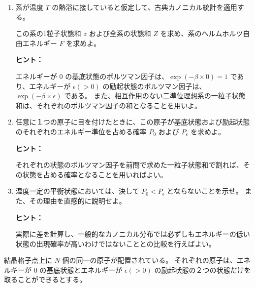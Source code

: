 \documentclass[uplatex,dvipdfmx,a4paper,11pt]{jsarticle}
\begin{document}
\begin{enumerate}
\setlength{\parskip}{0cm} %
\setlength{\itemsep}{0.3cm} %

\item
系が温度 $T$ の熱浴に接していると仮定して、古典カノニカル統計を適用する。

この系の1粒子状態和 $z$ および全系の状態和 $Z$ を求め、系のヘルムホルツ自由エネルギー $F$ を求めよ。

\begin{itembox}[l]{{\bf ヒント：}}

エネルギーが $0$ の基底状態のボルツマン因子は、$\exp(-\beta \times 0) = 1$ であり、エネルギーが $\epsilon (>0)$ の励起状態のボルツマン因子は、$\exp(-\beta \times \epsilon)$ である。
また、相互作用のない二準位理想系の一粒子状態和は、それぞれのボルツマン因子の和となることを用いよ。

\end{itembox}

\color{black}

\item
任意に１つの原子に目を付けたときに、この原子が基底状態および励起状態のそれぞれのエネルギー準位を占める確率 $P_0$ および $P_{\epsilon}$ を求めよ。

\begin{itembox}[l]{{\bf ヒント：}}

それぞれの状態のボルツマン因子を前問で求めた一粒子状態和で割れば、その状態を占める確率となることを用いればよい。

\end{itembox} 

\color{black}

\item
温度一定の平衡状態においては、決して $P_0 < P_{\epsilon}$ とならないことを示せ。
また、その理由を直感的に説明せよ。

\begin{itembox}[l]{{\bf ヒント：}}

実際に差を計算し、一般的なカノニカル分布では必ずしもエネルギーの低い状態の出現確率が高いわけではないこととの比較を行えばよい。

\end{itembox}

\color{black}

\end{enumerate}

\newpage

結晶格子点上に $N$ 個の同一の原子が配置されている。
それぞれの原子は、エネルギーが $0$ の基底状態とエネルギーが $\epsilon (>0)$ の励起状態の２つの状態だけを取ることができるとする。
\end{document}
